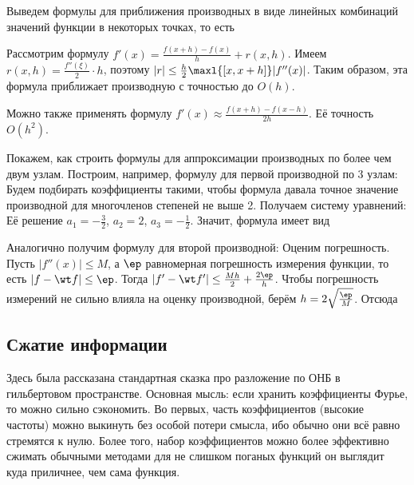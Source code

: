 \documentclass[a4paper]{article}
\begin{document}
Выведем формулы для приближения производных в виде линейных комбинаций
значений функции в некоторых точках, то есть 

Рассмотрим формулу $f'(x) =\frac{f(x+h)-f(x)}{h} + r(x,h)$.  Имеем
$r(x,h) = \frac{f''(\xi)}{2} \cdot h$, поэтому $|r| \le \frac h2
\maxl{[x,x+h]} |f''(x)|$.  Таким образом, эта формула приближает
производную с точностью до $O(h)$.

Можно также применять формулу $f'(x) \approx
\frac{f(x+h)-f(x-h)}{2h}$. Её точность $O(h^2)$.

Покажем, как строить формулы для аппроксимации производных по более
чем двум узлам. Построим, например, формулу для первой производной по
3 узлам:   Будем подбирать коэффициенты такими, чтобы формула
давала точное значение производной для многочленов степеней не выше 2.
Получаем систему уравнений:   Её решение $a_1 = -\frac32$, $a_2 = 2$, $a_3 =
-\frac12$.  Значит, формула имеет вид 

Аналогично получим формулу для второй производной:   Оценим погрешность. Пусть $|f''(x)| \le M$, а $\ep$
равномерная погрешность измерения функции, то есть $|f-\wt f| \le
\ep$.  Тогда $|f'-\wt f'| \le \frac{Mh}{2} + \frac{2\ep}{h}$. Чтобы
погрешность измерений не сильно влияла на оценку производной, берём $h
= 2\sqrt{\frac\ep M}$. Отсюда 

\subsection{Сжатие информации}

Здесь была рассказана стандартная сказка про разложение по ОНБ в
гильбертовом пространстве.  Основная мысль: если хранить коэффициенты
Фурье, то можно сильно сэкономить. Во первых, часть коэффициентов
(высокие частоты) можно выкинуть без особой потери смысла, ибо обычно
они всё равно стремятся к нулю. Более того, набор коэффициентов можно
более эффективно сжимать обычными методами для не слишком поганых
функций он выглядит куда приличнее, чем сама функция.
\end{document}
